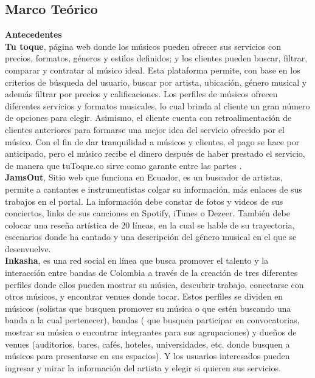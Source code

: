 \subsection{Marco Teórico}
\textbf{Antecedentes}\\
\textbf{Tu toque}, página web donde los músicos pueden ofrecer sus servicios con precios, formatos, géneros y estilos definidos; y los clientes pueden buscar, filtrar, comparar y contratar al músico ideal.
Esta plataforma permite, con base en los criterios de búsqueda del usuario, buscar por artista, ubicación, género musical y además filtrar por precios y calificaciones. Los perfiles de músicos ofrecen diferentes servicios y formatos musicales, lo cual brinda al cliente un gran número de opciones para elegir. Asimismo, el cliente cuenta con retroalimentación de clientes anteriores para formarse una mejor idea del servicio ofrecido por el músico.
Con el fin de dar tranquilidad a músicos y clientes, el pago se hace por anticipado, pero el músico recibe el dinero después de haber prestado el servicio, de manera que tuToque.co sirve como garante entre las partes  . \\

\textbf{JamsOut}, Sitio web que funciona en Ecuador, es un buscador de artistas, permite a cantantes e instrumentistas colgar su información, más enlaces de sus trabajos en el portal.
La información debe constar de fotos y videos de sus conciertos, links de sus canciones en Spotify, iTunes o Dezeer. También debe colocar una reseña artística de 20 líneas, en la cual se hable de su trayectoria, escenarios donde ha cantado y una descripción del género musical en el que se desenvuelve.\\
 
\textbf{Inkasha}, es una red social en línea que busca promover el talento y la interacción entre bandas de Colombia a través de la creación de tres diferentes perfiles donde ellos pueden mostrar su música, descubrir trabajo, conectarse con otros músicos, y encontrar venues donde tocar.
Estos perfiles se dividen en músicos (solistas que busquen promover su música o que estén buscando una banda a la cual pertenecer), bandas ( que busquen participar en convocatorias, mostrar su música o encontrar integrantes para sus agrupaciones) y dueños de venues (auditorios, bares, cafés, hoteles, universidades, etc. donde busquen a músicos para presentarse en sus espacios).
Y los usuarios interesados pueden ingresar y mirar la información del artista y elegir si quieren sus servicios.
